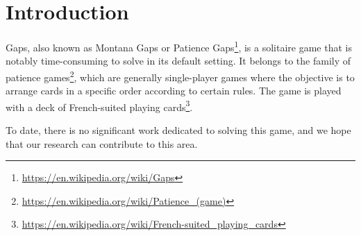 \chapter{Introduction}
Gaps, also known as Montana Gaps or Patience Gaps\footnote{\url{https://en.wikipedia.org/wiki/Gaps}}, is a solitaire game that is notably time-consuming to solve in its default setting. It belongs to the family of patience games\footnote{\url{https://en.wikipedia.org/wiki/Patience_(game)}}, which are generally single-player games where the objective is to arrange cards in a specific order according to certain rules. The game is played with a deck of French-suited playing cards\footnote{\url{https://en.wikipedia.org/wiki/French-suited_playing_cards}}.

To date, there is no significant work dedicated to solving this game, and we hope that our research can contribute to this area.


